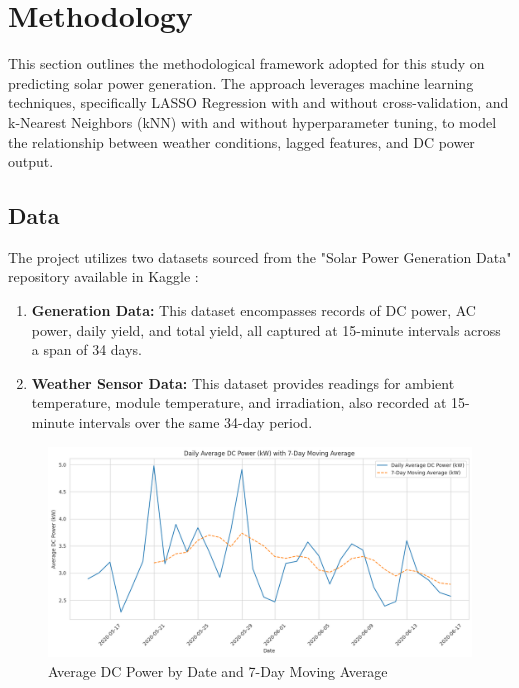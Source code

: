 \section{Methodology}

This section outlines the methodological framework adopted for this study on predicting solar power generation. The approach leverages machine learning techniques, specifically LASSO Regression with and without cross-validation, and k-Nearest Neighbors (kNN) with and without hyperparameter tuning, to model the relationship between weather conditions, lagged features, and DC power output. 

\subsection{Data}

The project utilizes two datasets sourced from the "Solar Power Generation Data" repository available in Kaggle \citep{solar-power-2020}:

\begin{enumerate}
   \item \textbf{Generation Data:} This dataset encompasses records of DC power, AC power, daily yield, and total yield, all captured at 15-minute intervals across a span of 34 days.
   \item \textbf{Weather Sensor Data:} This dataset provides readings for ambient temperature, module temperature, and irradiation, also recorded at 15-minute intervals over the same 34-day period.
\end{enumerate} 

\begin{figure}[!htpb]
    \centering
    \includegraphics[width=\linewidth]{Figures/dc_by_date_f.png}
    \caption{Average DC Power by Date and 7-Day Moving Average}
    \label{fig:dc_by_date}
\end{figure}

